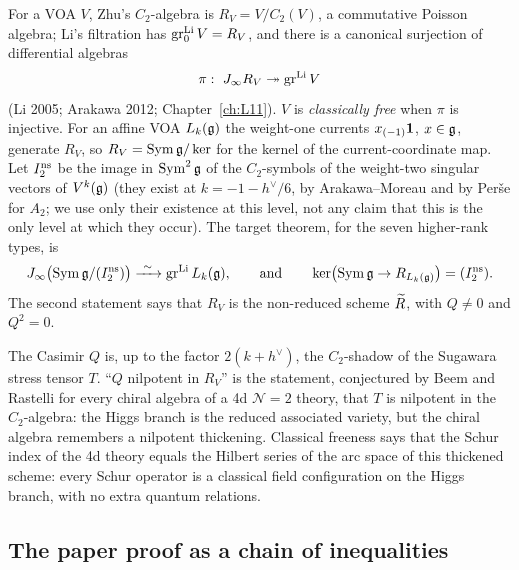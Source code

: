For a VOA $V$, Zhu's $C_2$-algebra is $R_V=V/C_2(V)$, a commutative Poisson algebra; Li's
filtration has $\operatorname{gr}^{\mathrm{Li}}_0V=R_V$, and there is a canonical surjection of differential algebras
\begin{equation}\label{l24:eq:li}
\pi:\ J_\infty R_V\twoheadrightarrow\operatorname{gr}^{\mathrm{Li}} V
\end{equation}
(Li 2005; Arakawa 2012; Chapter~\ref{ch:L11}). $V$ is \emph{classically free} when $\pi$ is injective.
For an affine VOA $L_k(\mathfrak g)$ the weight-one currents $x_{(-1)}\mathbf 1$, $x\in\mathfrak g$,
generate $R_V$, so $R_V=\operatorname{Sym}\mathfrak g/\ker$ for the kernel of the current-coordinate
map. Let $I_2^{\mathrm{ns}}$ be the image in $\operatorname{Sym}^2\mathfrak g$ of the $C_2$-symbols of the
weight-two singular vectors of $V^k(\mathfrak g)$ (they exist at $k=-1-h^\vee/6$, by
Arakawa--Moreau and by Perše for $A_2$; we use only their existence at this level, not any claim that this is the
only level at which they occur). The target theorem, for the seven higher-rank types, is
\begin{equation}\label{l24:eq:target}
\ltwentyfourJ\bigl(\operatorname{Sym}\ltwentyfourg/(\ltwentyfourIns)\bigr)\xrightarrow{\ \sim\ }\ltwentyfourgr L_k(\ltwentyfourg),
\qquad\text{and}\qquad \ker\bigl(\operatorname{Sym}\ltwentyfourg\to R_{L_k(\ltwentyfourg)}\bigr)=(\ltwentyfourIns).
\end{equation}
The second statement says that $R_V$ is the non-reduced scheme $\widetilde R$, with $Q\neq0$ and $Q^2=0$.

\begin{physics}
The Casimir $Q$ is, up to the factor $2(k+h^\vee)$, the $C_2$-shadow of the Sugawara stress tensor
$T$. ``$Q$ nilpotent in $R_V$'' is the statement, conjectured by Beem and Rastelli for every chiral
algebra of a 4d $\mathcal N=2$ theory, that $T$ is nilpotent in the $C_2$-algebra: the Higgs branch is
the reduced associated variety, but the chiral algebra remembers a nilpotent thickening. Classical
freeness says that the Schur index of the 4d theory equals the Hilbert series of the arc space of this
thickened scheme: every Schur operator is a classical field configuration on the Higgs branch, with no
extra quantum relations.
\end{physics}

\subsection{The paper proof as a chain of inequalities}\label{l24:sec:chain-paper}

